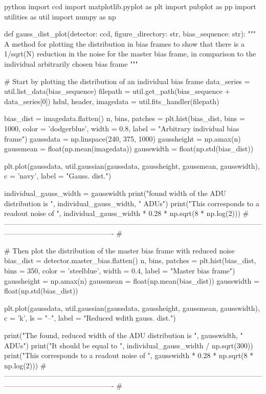 \documentclass[../main.tex]{subfiles}
\begin{document}
\begin{mintedbox}{python}
import ccd
import matplotlib.pyplot as plt
import pubplot as pp
import utilities as util
import numpy as np


def gauss_dist_plot(detector: ccd, figure_directory: str, bias_sequence: str):
"""
A method for plotting the distribution in bias frames
to show that there is a 1/sqrt(N) reduction in the noise
for the master bias frame, in comparison to the individual
arbitrarily chosen bias frame
"""

# Start by plotting the distribution of an individual bias frame
data_series  =  util.list_data(bias_sequence)
filepath  =  util.get_path(bias_sequence + data_series[0])
hdul, header, imagedata  =  util.fits_handler(filepath)

bias_dist  =  imagedata.flatten()
n, bins, patches  =  plt.hist(bias_dist, bins  =  1000, color  =  'dodgerblue', width  =  0.8,
label  =  "Arbitrary individual bias frame")
gaussdata  =  np.linspace(240, 375, 1000)
gaussheight  =  np.amax(n)
gaussmean  =  float(np.mean(imagedata))
gausswidth  =  float(np.std(bias_dist))

plt.plot(gaussdata, util.gaussian(gaussdata, gaussheight, gaussmean, gausswidth), c  =  'navy',
label  =  "Gauss. dist.")

individual_gauss_width  =  gausswidth
print("\nThe found width of the ADU distribution is ", individual_gauss_width, " ADUs")
print("This corresponds to a readout noise of ", individual_gauss_width * 0.28 * np.sqrt(8 * np.log(2)))
# ---------------------------------------------------------------------------------------------------------------------------------------------------------- #

# Then plot the distribution of the master bias frame with reduced noise
bias_dist  =  detector.master_bias.flatten()
n, bins, patches  =  plt.hist(bias_dist, bins  =  350, color  =  'steelblue', width  =  0.4, label  =  "Master bias frame")
gaussheight  =  np.amax(n)
gaussmean  =  float(np.mean(bias_dist))
gausswidth  =  float(np.std(bias_dist))

plt.plot(gaussdata, util.gaussian(gaussdata, gaussheight, gaussmean, gausswidth), c  =  'k', ls  =  "--",
label  =  "Reduced wdith gauss. dist.")

print("The found, reduced width of the ADU distribution is ", gausswidth, " ADUs")
print("It should be equal to ", individual_gauss_width / np.sqrt(300))
print("This corresponds to a readout noise of ", gausswidth * 0.28 * np.sqrt(8 * np.log(2)))
# ---------------------------------------------------------------------------------------------------------------------------------------------------------- #


\end{mintedbox}
\end{document}
